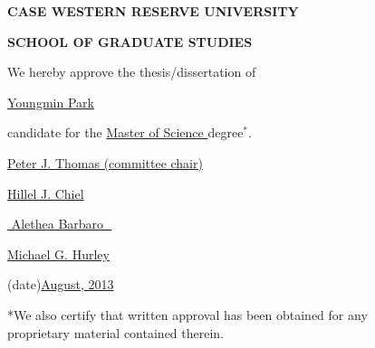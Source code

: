 \newpage

\begin{center}
\begin{center}
\textbf{CASE WESTERN RESERVE UNIVERSITY}
\end{center}
\begin{center}
\textbf{SCHOOL OF GRADUATE STUDIES}
\end{center}
\vfill
\large


We hereby approve the thesis/dissertation of
\begin{center}\underline{\quad\quad\quad\quad\quad Youngmin Park \quad\quad\quad\quad\quad}\end{center}

candidate for the \underline{\quad\quad\quad Master of Science \quad\quad\quad} degree$^*$.
\vfill
\begin{center}\underline{\; Peter J. Thomas (committee chair) \;}\end{center}
\begin{center}\underline{\quad\quad\quad\quad\quad Hillel J. Chiel \quad\quad\quad\quad\quad}\end{center}
\begin{center}\underline{\,\,\quad\quad\quad\quad Alethea Barbaro \quad\quad\quad\quad\,\,}\end{center}
\begin{center}\underline{\;\;\;\quad\quad\quad Michael G. Hurley  \quad\quad\quad\;\;\;}\end{center}

\vfill
\begin{center}(date)\underline{\quad\quad August, 2013 \quad\quad}\end{center}
\vfill

*We also certify that written approval has been obtained for any\\
proprietary material contained therein. 


\end{center}
\normalsize